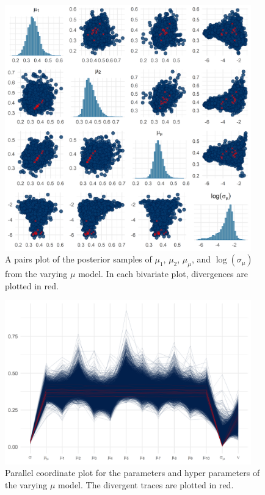 \begin{figure}
   \centering
   \includegraphics[width=0.95\textwidth]{./figures/ch-5/plot-pp-mu-pairs.png}
   \caption{A pairs plot of the posterior samples of $\mu_1$, $\mu_2$, $\mu_\mu$, and $\log(\sigma_\mu)$ from the varying $\mu$ model. In each bivariate plot, divergences are plotted in red.}
   \label{fig:pp_mu_pairs} 
\end{figure}

\begin{figure}
   \centering
   \includegraphics[width=0.95\textwidth]{./figures/ch-5/plot-pp-mu-parcoord.png}
   \caption{Parallel coordinate plot for the parameters and hyper parameters of the varying $\mu$ model. The divergent traces are plotted in red.}
   \label{fig:pp_mu_parcoord} 
\end{figure}


